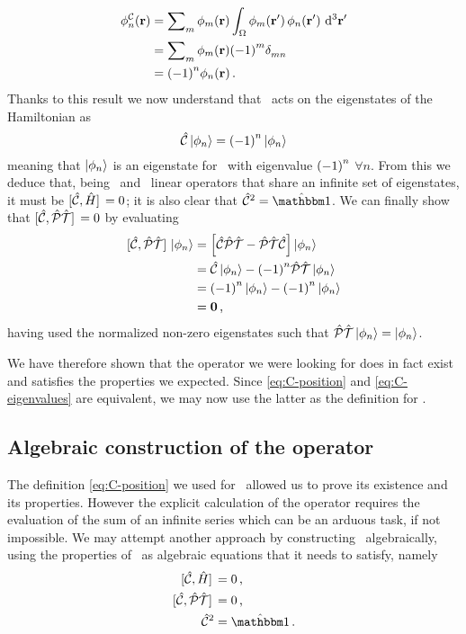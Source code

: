             \begin{align*}
                \phi_n^\mcC\pqty{\vb{r}}
                &= \sum\nolimits_m \phi_m\pqty{\vb{r}} \int\nolimits_\Omega \phi_m\pqty*{\vb{r}'} \phi_n\pqty*{\vb{r}'} \dd[3]{\vb{r}'} \\
                &= \sum\nolimits_m \phi_m\pqty{\vb{r}} \pqty{-1}^m \tensor{\delta}{_m_n} \\
                &= \pqty{-1}^n \phi_n\pqty{\vb{r}}\myperiod
            \end{align*}
            Thanks to this result we now understand that \hC\ acts on the eigenstates of the Hamiltonian as
            \begin{equation}
                \label{eq:C-eigenvalues}
                \hC\ket{\phi_n} = \pqty{-1}^n\ket{\phi_n}
            \end{equation}
            meaning that $\ket{\phi_n}$ is an eigenstate for \hC\ with eigenvalue $\pqty{-1}^n$ $\forall n$. From this we deduce that, being \hC\ and \hH\ linear operators that share an infinite set of eigenstates, it must be $\comm*{\hC}{\hH} = 0$; it is also clear that $\hC^2 = \hidM$. We can finally show that $\comm*{\hC}{\hPT} = 0$ by evaluating
            \begin{align*}
                \comm*{\hC}{\hPT}\ket{\phi_n}
                & = \bqty{\hC\hPT - \hPT\hC}\ket{\phi_n}\\
                & = \hC\ket{\phi_n} - \pqty{-1}^n\hPT\ket{\phi_n}\\
                & = \pqty{-1}^n \ket{\phi_n} - \pqty{-1}^n \ket{\phi_n}\\
                & = \vb{0}
                \mycomma
            \end{align*}
            having used the normalized non-zero eigenstates such that $\mathcal{\hat{P}}\mathcal{\hat{T}}\ket{\phi_n} = \ket{\phi_n}$.

            We have therefore shown that the operator we were looking for does in fact exist and satisfies the properties we expected. Since \eqref{eq:C-position} and \eqref{eq:C-eigenvalues} are equivalent, we may now use the latter as the definition for \hC.

        \subsection{Algebraic construction of the \texorpdfstring{\hC}{C} operator}
            The definition \eqref{eq:C-position} we used for \hC\ allowed us to prove its existence and its properties. However the explicit calculation of the operator requires the evaluation of the sum of an infinite series which can be an arduous task, if not impossible. We may attempt another approach \cite{bender2024} by constructing \hC\ algebraically, using the properties of \hC\ as algebraic equations that it needs to satisfy, namely
            \begin{align*}
                \comm*{\hC}{\hH} &= 0 
                \mycomma \\
                \comm*{\hC}{\hPT} &= 0 
                \mycomma \\
                \hC^2 &= \hidM
                \myperiod
            \end{align*}
            
